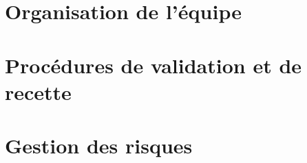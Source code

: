 \part{Organisation de l'équipe}
\setcounter{section}{0}

\part{Procédures de validation et de recette}
\setcounter{section}{0}

\part{Gestion des risques}
\setcounter{section}{0}



